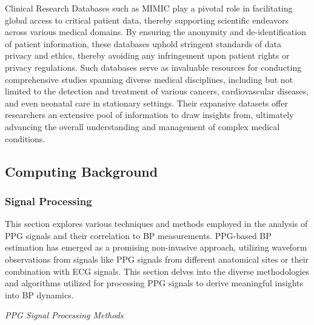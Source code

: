 \vspace{0.2cm}

Clinical Research Databases such as MIMIC play a pivotal role in facilitating global access to critical patient data, thereby supporting scientific endeavors across various medical domains.
By ensuring the anonymity and de-identification of patient information, these databases uphold stringent standards of data privacy and ethics, thereby avoiding any infringement upon patient rights or privacy regulations.
Such databases serve as invaluable resources for conducting comprehensive studies spanning diverse medical disciplines, including but not limited to the detection and treatment of various cancers, cardiovascular diseases, and even neonatal care in stationary settings.
Their expansive datasets offer researchers an extensive pool of information to draw insights from, ultimately advancing the overall understanding and management of complex medical conditions.

\subsection{Computing Background}
\label{subsec:computing_background}

\subsubsection{Signal Processing}
\label{subsubsec:signal_processing}

This section explores various techniques and methods employed in the analysis of PPG signals and their correlation to BP measurements.
PPG-based BP estimation has emerged as a promising non-invasive approach, utilizing waveform observations from signals like PPG signals from different anatomical sites or their combination with ECG signals.
This section delves into the diverse methodologies and algorithms utilized for processing PPG signals to derive meaningful insights into BP dynamics.

\vspace{0.2cm}
\textit{PPG Signal Processing Methods}
\vspace{0.2cm}

